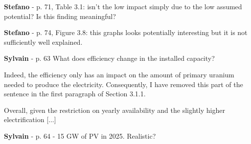 \documentclass[12pt,a4paper]{article}
\begin{document}
\noindent 

\begin{mdframed}[style=manuscript] %

\end{mdframed}

\begin{mdframed}[style=comment] %
{\color{orange} \textbf{Stefano}} - p. 71, Table 3.1: isn’t the low impact simply due to the low assumed potential? Is this finding meaningful?
\end{mdframed}

\noindent 

\begin{mdframed}[style=manuscript] %

\end{mdframed}

\begin{mdframed}[style=comment] %
{\color{orange} \textbf{Stefano}} - p. 74, Figure 3.8: this graphs looks potentially interesting but it is not sufficiently well explained.
\end{mdframed}

\noindent 

\begin{mdframed}[style=manuscript] %

\end{mdframed}

\begin{mdframed}[style=comment] %
{\color{purple} \textbf{Sylvain}} - p. 63 What does efficiency change in the installed capacity?
\end{mdframed}

\noindent Indeed, the efficiency only has an impact on the amount of primary uranium needed to produce the electricity. Consequently, I have removed this part of the sentence {\color{blue}in the first paragraph of Section 3.1.1}. 

\begin{mdframed}[style=manuscript] %
Overall, given the restriction on yearly availability and the slightly higher electrification [...]
\end{mdframed}

\begin{mdframed}[style=comment] %
{\color{purple} \textbf{Sylvain}} - p. 64 - 15 GW of PV in 2025. Realistic?
\end{mdframed}
\end{document}
